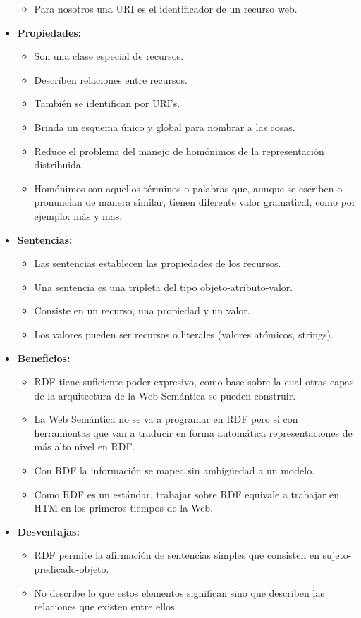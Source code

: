 \documentclass[a4paper,12pt,twoside,final,spanish]{article}
\begin{document}
\begin{itemize}
\begin{itemize}
	\item Para nosotros una URI es el identificador de un recurso web.
	\end{itemize}
\item \textbf{Propiedades:}
	\begin{itemize}
	\item Son una clase especial de recursos.
	\item Describen relaciones entre recursos.
	\item También se identifican por URI's.
	\item Brinda un esquema único y global para nombrar a las cosas.
	\item Reduce el problema del manejo de homónimos de la representación distribuida.
	\item Homónimos son aquellos términos o palabras que, aunque se escriben o 				pronuncian de manera similar, tienen diferente valor gramatical, como por ejemplo: 	más y mas.
	\end{itemize}
\item \textbf{Sentencias:}
	\begin{itemize}
	\item Las sentencias establecen las propiedades de los recursos.
	\item Una sentencia es una tripleta del tipo objeto-atributo-valor.
	\item Consiste en un recurso, una propiedad y un valor.
	\item Los valores pueden ser recursos o literales (valores atómicos, strings).
	\end{itemize}
\item \textbf{Beneficios:}
	\begin{itemize}
	\item RDF tiene suficiente poder expresivo, como base sobre la cual otras capas de 	la arquitectura de la Web Semántica se pueden construir.
	\item La Web Semántica no se va a programar en RDF pero si con herramientas que 		van a traducir en forma automática representaciones de más alto nivel en RDF.
	\item Con RDF la información se mapea sin ambigüedad a un modelo.
	\item Como RDF es un estándar, trabajar sobre RDF equivale a trabajar en HTM en 		los primeros tiempos de la Web.
	\end{itemize}
\item \textbf{Desventajas:}
	\begin{itemize}
	\item RDF permite la afirmación de sentencias simples que consisten en sujeto-			predicado-objeto.
	\item No describe lo que estos elementos significan sino que describen las				relaciones que existen entre ellos.
	\end{itemize}
\end{itemize}
\end{document}
